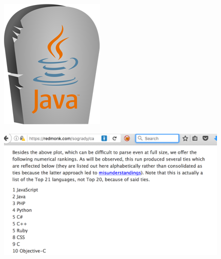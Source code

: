 \documentclass{beamer}
\begin{document}
\begin{frame}
	\begin{figure}
		\centering
		\includegraphics[width=0.5\linewidth]{Images/javadead}
	\end{figure}
\end{frame}

\begin{frame}
	\begin{figure}
		\centering
		\includegraphics[width=0.9\linewidth]{Images/redmonk}
	\end{figure}
\end{frame}
\end{document}
